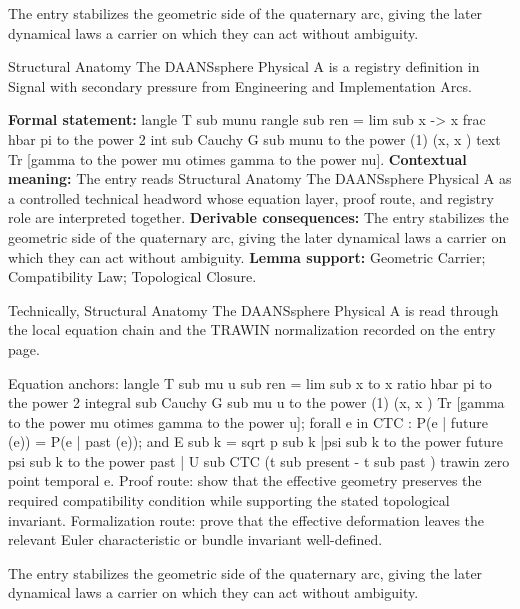 The entry stabilizes the geometric side of the quaternary arc, giving the later dynamical laws a carrier on which they can act without ambiguity.
\clearpage


\begingroup\small
{}
Structural Anatomy The DAANSsphere Physical A is a registry definition in Signal with secondary pressure from Engineering and Implementation Arcs.

\begingroup\footnotesize\setlength{\emergencystretch}{3em}\sloppy
\textbf{Formal statement:} langle T sub munu rangle sub ren = lim sub x -> x frac hbar pi to the power 2 int sub Cauchy G sub munu to the power (1) (x, x ) text Tr [gamma to the power mu otimes gamma to the power nu]. \textbf{Contextual meaning:} The entry reads Structural Anatomy The DAANSsphere Physical A as a controlled technical headword whose equation layer, proof route, and registry role are interpreted together. \textbf{Derivable consequences:} The entry stabilizes the geometric side of the quaternary arc, giving the later dynamical laws a carrier on which they can act without ambiguity. \textbf{Lemma support:} Geometric Carrier; Compatibility Law; Topological Closure.\par
\endgroup

Technically, Structural Anatomy The DAANSsphere Physical A is read through the local equation chain and the TRAWIN normalization recorded on the entry page.

Equation anchors: langle T sub mu u sub ren = lim sub x to x ratio hbar pi to the power 2 integral sub Cauchy G sub mu u to the power (1) (x, x ) Tr [gamma to the power mu otimes gamma to the power u]; forall e in CTC : P(e | future (e)) = P(e | past (e)); and E sub k = sqrt p sub k |psi sub k to the power future psi sub k to the power past | U sub CTC (t sub present - t sub past ) trawin zero point temporal e. Proof route: show that the effective geometry preserves the required compatibility condition while supporting the stated topological invariant. Formalization route: prove that the effective deformation leaves the relevant Euler characteristic or bundle invariant well-defined.

The entry stabilizes the geometric side of the quaternary arc, giving the later dynamical laws a carrier on which they can act without ambiguity.
\endgroup

